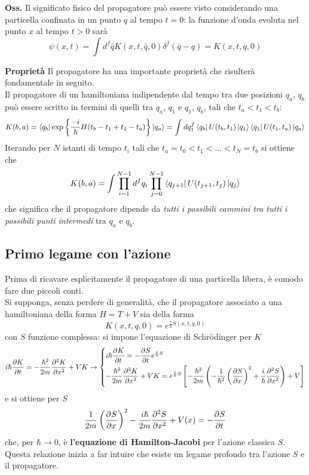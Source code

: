 \textbf{Oss.} Il significato fisico del propagatore può essere visto considerando una particella confinata
in un punto $q$ al tempo $t=0$: la funzione d'onda evoluta nel punto $x$ al tempo $t>0$ sarà
$$\psi(x,t) = \int d^f\bar q K(x,t,\bar q,0)\delta^f(\bar q-q) = K(x,t,q,0) $$

\textbf{Proprietà} Il propagatore ha una importante proprietà che risulterà fondamentale in seguito.
\\Il propagatore di un hamiltoniana indipendente dal tempo tra due posizioni $q_a$, $q_b$ può essere
scritto in termini di quelli tra $q_a$, $q_1$ e $q_1$, $q_b$, tali che $t_a<t_1<t_b$:
$$K(b,a) = \bra{q_b}\exp\left\{\frac{-i}{\hbar}H(t_b-t_1+t_1-t_a)\right\}\ket{q_a} = 
\int dq^f_1\bra{q_b}U(t_b,t_1)\ket{q_1}\bra{q_1}U(t_1,t_a)\ket{q_a}
$$
Iterando per $N$ istanti di tempo $t_i$ tali che $t_a=t_0<t_1<...<t_N=t_b$ si ottiene che
\begin{equation}
    K(b,a)=\int \prod_{i=1}^{N-1} d^fq_i \prod_{j=0}^{N-1}\bra{q_{j+1}}U(t_{j+1},t_j)\ket{q_j}
    \label{eq:K_iter}
\end{equation}
che significa che il propagatore dipende da \textit{tutti i possibili cammini tra
tutti i possibili punti intermedi} tra $q_a$ e $q_b$.

\subsection{Primo legame con l'azione}
Prima di ricavare esplicitamente il propagatore di una particella libera, è comodo fare due piccoli conti.\\
Si supponga, senza perdere di generalità, che il propagatore associato a una hamiltoniana della forma
$H = T + V$ sia della forma
$$K(x,t,q,0) = e^{\frac{i}{\hbar}S(x,t,q,0)}$$
con $S$ funzione complessa: si impone l'equazione di Schrödinger per $K$
$$
i\hbar\pdv{K}{t}=-\frac{\hbar^2}{2m}\pdv[2]{K}{x}+VK \to
\begin{dcases}
i\hbar\pdv[]{K}{t}=-\pdv[]{S}{t}e^{\frac{i}{\hbar}S}\\
-\frac{\hbar^2}{2m}\pdv[2]{K}{x}+VK=e^{\frac{i}{\hbar}S}\left[-\frac{\hbar^2}{2m}\left(-\frac{1}{\hbar^2}
\left(\pdv[]{S}{x}\right)^2 + \frac{i}{\hbar}\pdv[2]{S}{x}\right)+V\right]
\end{dcases}
$$
e si ottiene per $S$
$$\frac{1}{2m}\left(\pdv[]{S}{x}\right)^2-\frac{i\hbar}{2m}\pdv[2]{S}{x}+V(x) = -\pdv[]{S}{t}$$
che, per $\hbar\rightarrow0$, è \textbf{l'equazione di Hamilton-Jacobi} per l'azione classica $S$.\\
Questa relazione inizia a far intuire che esiste un legame profondo tra l'azione $S$ e il propagatore.

